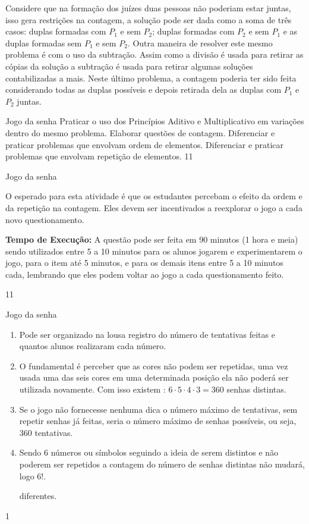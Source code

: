 Considere que na formação dos juízes duas pessoas não poderiam estar juntas, isso gera restrições na contagem, a solução pode ser dada como a soma de três casos: duplas formadas com  $P_1$ e sem $P_2$; duplas formadas com  $P_2$ e sem $P_1$ e as duplas formadas sem $P_1$ e sem $P_2$. Outra maneira de resolver este mesmo problema é com o uso da subtração. Assim como a divisão é usada para retirar as cópias da solução a subtração é usada para retirar algumas soluções contabilizadas a mais. Neste último problema, a contagem poderia ter sido feita considerando todas as duplas possíveis e depois retirada dela as duplas com $P_1$ e $P_2$ juntas. 
\def\currentcolor{session2}
\begin{objectives}{Jogo da senha}
{
Praticar o uso dos Princípios Aditivo e Multiplicativo em variações dentro do mesmo problema. Elaborar questões de contagem. Diferenciar e praticar problemas que envolvam ordem de elementos. Diferenciar e praticar problemas que envolvam repetição de elementos.
}{1}{1}
\end{objectives}
\mspace{-1.5em}
\begin{sugestions}{Jogo da senha}
{
O esperado para esta atividade é que os estudantes percebam o efeito da ordem e da repetição na contagem. Eles devem ser incentivados a reexplorar o jogo a cada novo questionamento.

\textbf{Tempo de Execução:} A questão pode ser feita em 90 minutos (1 hora e meia) sendo utilizados entre 5 a 10 minutos para os alunos jogarem e experimentarem o jogo,  para o item  até 5  minutos, e para os demais itens entre 5 a 10 minutos cada, lembrando que eles podem voltar ao jogo a cada questionamento feito.
}{1}{1}
\end{sugestions}
\mspace{-.5em}
\begin{answer}{Jogo da senha}
{
\begin{enumerate}
\item Pode ser organizado na lousa registro do número de tentativas feitas e quantos alunos realizaram cada número. 

\setcounter{enumi}{2}
\item O fundamental é perceber que as cores não podem ser repetidas, uma vez usada uma das seis cores em uma determinada posição ela não poderá ser utilizada novamente. Com isso existem : $6 \cdot 5 \cdot 4 \cdot 3 = 360$ senhas distintas. 
\item Se o jogo não fornecesse nenhuma dica o número máximo de tentativas, sem repetir senhas já feitas, seria o número máximo de senhas possíveis, ou seja, $360$ tentativas.

\item Sendo 6 números ou símbolos seguindo a ideia de serem distintos e não poderem ser repetidos a contagem do número de senhas distintas não mudará, logo $6!$. 

diferentes.
\end{enumerate}
}{1}
\end{answer}
